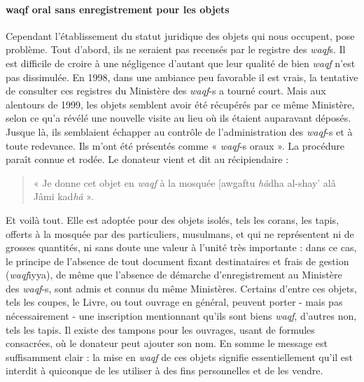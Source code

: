 \paragraph{waqf oral sans enregistrement pour les objets}
Cependant l'établissement du statut juridique des objets qui nous occupent, pose problème.
Tout d'abord, ils ne seraient pas recensés par le registre des \textit{waqf}s. Il est difficile de croire à une négligence d'autant que leur qualité de bien \textit{waqf} n'est pas dissimulée. En 1998, dans une ambiance peu favorable il est vrais, la tentative de consulter ces registres du Ministère des \textit{waqf}-s a tourné court. Mais aux alentours de 1999, les objets semblent avoir été récupérés par ce même Ministère, selon ce qu'a révélé une nouvelle visite au lieu où ils étaient auparavant déposés. Jusque là, ils semblaient échapper au contrôle de l'administration des \textit{waqf}-s et à toute redevance.
Ils m'ont été présentés comme « \textit{waqf}-s oraux ». La procédure paraît connue et rodée. Le donateur vient et dit au récipiendaire : \begin{quote}
    « Je donne cet
objet en \textit{waqf} à la mosquée [awgaftu \textit{hâ}dha al-shay' alâ Jâmi kad\textit{hâ} ».
\end{quote} 
Et voilà tout. Elle est adoptée pour des objets isolés, tels les corans, les tapis, offerts à la mosquée par des particuliers, musulmans, et qui ne représentent ni de grosses quantités, ni sans doute une valeur à l'unité très importante : dans ce cas, le principe de l'absence de tout document fixant destinataires et frais de gestion (\textit{waqf}iyya), de même que l'absence de démarche d'enregistrement au Ministère des \textit{waqf}-s, sont admis et connus du même Ministères. Certains d'entre ces objets, tels les coupes, le Livre, ou tout ouvrage en général, peuvent porter - mais pas nécessairement - une inscription mentionnant qu'ils sont biens \textit{waqf}, d'autres non, tels les tapis. Il existe des tampons pour les ouvrages, usant de formules consacrées, où le donateur peut ajouter son nom. En somme le message est suffisamment clair : la mise en \textit{waqf} de ces objets signifie essentiellement qu'il est interdit à quiconque de les utiliser à des fins personnelles et de
 les vendre.
